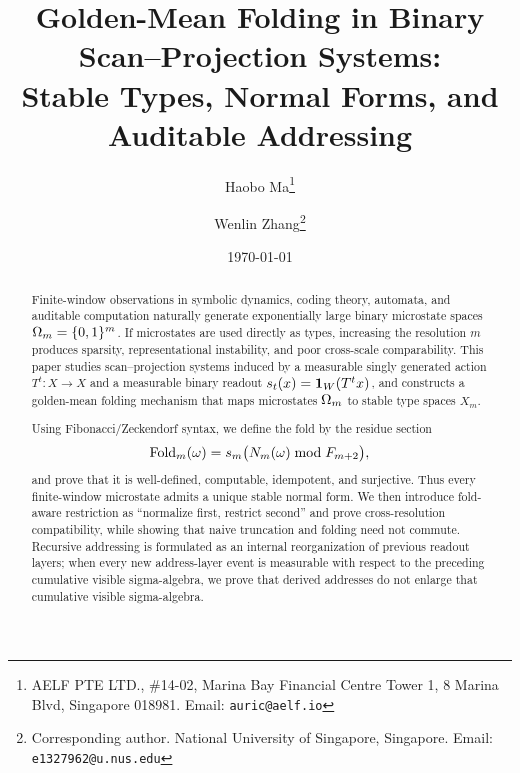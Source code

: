 

\title{Golden-Mean Folding in Binary Scan--Projection Systems:\\Stable Types, Normal Forms, and Auditable Addressing}
\author{
  Haobo Ma\thanks{AELF PTE LTD., \#14-02, Marina Bay Financial Centre Tower 1, 8 Marina Blvd, Singapore 018981. Email: \texttt{auric@aelf.io}}
  \and
  Wenlin Zhang\thanks{Corresponding author. National University of Singapore, Singapore. Email: \texttt{e1327962@u.nus.edu}}
}
\date{\today}


\maketitle

\begin{abstract}
Finite-window observations in symbolic dynamics, coding theory, automata, and auditable computation naturally generate exponentially large binary microstate spaces \(\Omega_m=\{0,1\}^m\).  If microstates are used directly as types, increasing the resolution \(m\) produces sparsity, representational instability, and poor cross-scale comparability.  This paper studies scan--projection systems induced by a measurable singly generated action \(T^t:X\to X\) and a measurable binary readout \(s_t(x)=\mathbf{1}_W(T^t x)\), and constructs a golden-mean folding mechanism that maps microstates \(\Omega_m\) to stable type spaces \(X_m\).

Using Fibonacci/Zeckendorf syntax, we define the fold by the residue section
\[
\operatorname{Fold}_m(\omega)=s_m\bigl(N_m(\omega)\bmod F_{m+2}\bigr),
\]
and prove that it is well-defined, computable, idempotent, and surjective.  Thus every finite-window microstate admits a unique stable normal form.  We then introduce fold-aware restriction as ``normalize first, restrict second'' and prove cross-resolution compatibility, while showing that naive truncation and folding need not commute.  Recursive addressing is formulated as an internal reorganization of previous readout layers; when every new address-layer event is measurable with respect to the preceding cumulative visible sigma-algebra, we prove that derived addresses do not enlarge that cumulative visible sigma-algebra.


\end{abstract}
